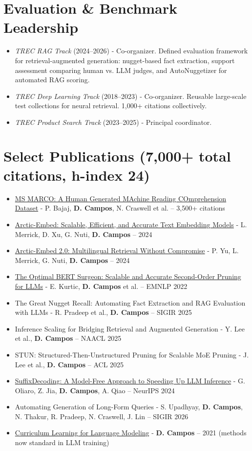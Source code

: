 \documentclass[line,margin]{res}
\begin{document}
\begin{resume}
\section{Evaluation \& Benchmark Leadership}
\begin{itemize} \itemsep -4pt
\item {\sl TREC RAG Track} (2024--2026) - Co-organizer. Defined evaluation framework for retrieval-augmented generation: nugget-based fact extraction, support assessment comparing human vs. LLM judges, and AutoNuggetizer for automated RAG scoring.
\item {\sl TREC Deep Learning Track} (2018--2023) - Co-organizer. Reusable large-scale test collections for neural retrieval. 1,000+ citations collectively.
\item {\sl TREC Product Search Track} (2023--2025) - Principal coordinator.
\end{itemize}
\section{Select Publications (7,000+ total citations, h-index 24)}
\begin{itemize} \itemsep -3pt
    \item \href{https://arxiv.org/abs/1611.09268}{MS MARCO: A Human Generated MAchine Reading COmprehension Dataset} - P. Bajaj, \textbf{D. Campos}, N. Craswell et al. -- 3,500+ citations
    \item \href{https://arxiv.org/abs/2405.05374}{Arctic-Embed: Scalable, Efficient, and Accurate Text Embedding Models} - L. Merrick, D. Xu, G. Nuti, \textbf{D. Campos} -- 2024
    \item \href{https://arxiv.org/abs/2412.04506}{Arctic-Embed 2.0: Multilingual Retrieval Without Compromise} - P. Yu, L. Merrick, G. Nuti, \textbf{D. Campos} -- 2024
    \item \href{https://arxiv.org/abs/2203.07259}{The Optimal BERT Surgeon: Scalable and Accurate Second-Order Pruning for LLMs} - E. Kurtic, \textbf{D. Campos} et al. -- EMNLP 2022
    \item The Great Nugget Recall: Automating Fact Extraction and RAG Evaluation with LLMs - R. Pradeep et al., \textbf{D. Campos} -- SIGIR 2025
    \item Inference Scaling for Bridging Retrieval and Augmented Generation - Y. Lee et al., \textbf{D. Campos} -- NAACL 2025
    \item STUN: Structured-Then-Unstructured Pruning for Scalable MoE Pruning - J. Lee et al., \textbf{D. Campos} -- ACL 2025
    \item \href{https://arxiv.org/abs/2411.04975}{SuffixDecoding: A Model-Free Approach to Speeding Up LLM Inference} - G. Oliaro, Z. Jia, \textbf{D. Campos}, A. Qiao -- NeurIPS 2024
    \item Automating Generation of Long-Form Queries - S. Upadhyay, \textbf{D. Campos}, N. Thakur, R. Pradeep, N. Craswell, J. Lin -- SIGIR 2026
    \item \href{https://arxiv.org/abs/2108.02170}{Curriculum Learning for Language Modeling} - \textbf{D. Campos} -- 2021 (methods now standard in LLM training)
\end{itemize}
\end{resume}
\end{document}
